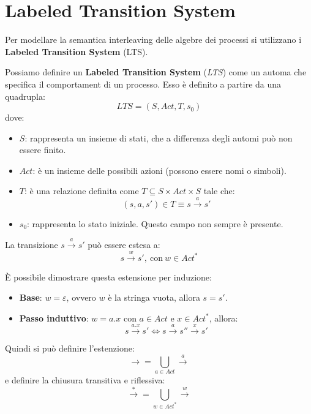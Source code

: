 \section{Labeled Transition System}
Per modellare la semantica interleaving delle algebre dei processi si utilizzano
i \textbf{Labeled Transition System} (LTS).
\begin{definizione}
    Possiamo definire un \textbf{Labeled Transition System} (\textit{LTS}) come
    un automa che specifica il comportament di un processo. Esso è definito a
    partire da una quadrupla:
    \begin{equation}
        LTS = (S, Act, T, s_0)
    \end{equation}
    dove:
    \begin{itemize}
        \item \textbf{$S$}: rappresenta un insieme di stati, che a differenza
              degli automi può non essere finito.
        \item \textbf{$Act$}: è un insieme delle possibili azioni (possono essere
              nomi o simboli).
        \item \textbf{$T$}: è una relazione definita come
              $T \subseteq S \times Act \times S$ tale che:
              $$(s, a, s') \in T \equiv s \xrightarrow{a} s'$$
        \item \textbf{$s_0$}: rappresenta lo stato iniziale. Questo campo non
              sempre è presente.
    \end{itemize}
\end{definizione}
La transizione $s \xrightarrow{a} s'$ può essere estesa a:
\begin{equation}
    s \xrightarrow{w} s', \ \text{con} \ w \in Act^*
\end{equation}
\begin{dimostrazione}
    È possibile dimostrare questa estensione per induzione:
    \begin{itemize}
        \item \textbf{Base}: $w = \varepsilon$, ovvero $w$ è la stringa vuota,
              allora $s = s'$.
        \item \textbf{Passo induttivo}: $w = a . x$ con $a \in Act$ e
              $x \in Act^*$, allora:
              \begin{equation}
                  s \xrightarrow{a. x} s' \iff s \xrightarrow{a} s'' \xrightarrow{x} s'
              \end{equation}
    \end{itemize}
\end{dimostrazione}
Quindi si può definire l'estenzione:
\begin{equation}
    \xrightarrow{}  = \bigcup_{a \in Act} \xrightarrow{a}
\end{equation}
e definire la chiusura transitiva e riflessiva:
\begin{equation}
    \xrightarrow{\ast}  = \bigcup_{w \in Act^{\ast}} \xrightarrow{w}
\end{equation}

